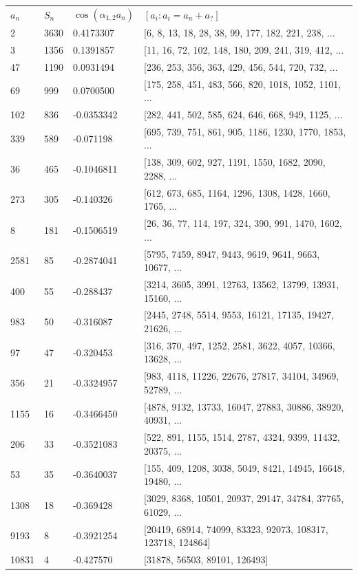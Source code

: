 \documentclass{article}
\theoremstyle{definition}
\theoremstyle{remark}
\numberwithin{equation}{section}
\begin{document}
{\begin{tabular}{llll}
$a_n$ & $S_n$ & $\cos(\alpha_{1,2}  a_n)$ & $[a_i : a_i = a_n + a_?]$\\

2 & 3630 & 0.4173307 & [6, 8, 13, 18, 28, 38, 99, 177, 182, 221, 238, ...\\
3 & 1356 & 0.1391857 & [11, 16, 72, 102, 148, 180, 209, 241, 319, 412, ...\\
47 & 1190 & 0.0931494 & [236, 253, 356, 363, 429, 456, 544, 720, 732, ...\\
69 & 999 & 0.0700500 & [175, 258, 451, 483, 566, 820, 1018, 1052, 1101, ...\\
102 & 836 & -0.0353342 & [282, 441, 502, 585, 624, 646, 668, 949, 1125, ...\\
339 & 589 & -0.071198 & [695, 739, 751, 861, 905, 1186, 1230, 1770, 1853, ...\\
36 & 465 & -0.1046811 & [138, 309, 602, 927, 1191, 1550, 1682, 2090, 2288, ...\\
273 & 305 & -0.140326 & [612, 673, 685, 1164, 1296, 1308, 1428, 1660, 1765, ...\\
8 & 181 & -0.1506519 & [26, 36, 77, 114, 197, 324, 390, 991, 1470, 1602, ...\\
2581 & 85 & -0.2874041 & [5795, 7459, 8947, 9443, 9619, 9641, 9663, 10677, ...\\
400 & 55 & -0.288437 & [3214, 3605, 3991, 12763, 13562, 13799, 13931, 15160, ...\\
983 & 50 & -0.316087 & [2445, 2748, 5514, 9553, 16121, 17135, 19427, 21626, ...\\
97 & 47 & -0.320453 & [316, 370, 497, 1252, 2581, 3622, 4057, 10366, 13628, ...\\
356 & 21 & -0.3324957 & [983, 4118, 11226, 22676, 27817, 34104, 34969, 52789, ...\\
1155 & 16 & -0.3466450 & [4878, 9132, 13733, 16047, 27883, 30886, 38920, 40931, ...\\
206 & 33 & -0.3521083 & [522, 891, 1155, 1514, 2787, 4324, 9399, 11432, 20375, ...\\
53 & 35 & -0.3640037 & [155, 409, 1208, 3038, 5049, 8421, 14945, 16648, 19480, ...\\
1308 & 18 & -0.369428 & [3029, 8368, 10501, 20937, 29147, 34784, 37765, 61029, ...\\
9193 & 8 & -0.3921254 & [20419, 68914, 74099, 83323, 92073, 108317, 123718, 124864]\\
10831 & 4 & -0.427570 & [31878, 56503, 89101, 126493]\\

\end{tabular}}
\end{document}
